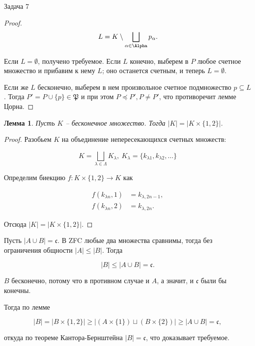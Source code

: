 \documentclass{article}
\newtheorem{lemma}{Лемма}
\newcommand{\abs}[1]{\left\lvert#1\right\rvert}
\newcommand{\continuum}{\mathfrak{c}}
\renewcommand{\setminus}{\mathbin{\backslash}}
\begin{document}
\begin{section}{Задача 7}
\begin{proof}
			\begin{equation*}
				L = K \setminus \bigsqcup_{\alpha \in \Alpha} p_\alpha.
			\end{equation*}

			Если $L = \emptyset$, получено требуемое. Если $L$ конечно, выберем в $P$ любое счетное множество и прибавим к нему $L$; оно останется счетным, и теперь $L = \emptyset$.

			Если же $L$ бесконечно, выберем в нем произвольное счетное подмножество $p \subseteq L$. Тогда $P' = P \cup \{p\} \in \mathfrak{P}$ и при этом $P \preceq P', P \ne P'$, что противоречит лемме Цорна.
		\end{proof}

		\begin{lemma}
			Пусть $K$ -- бесконечное множество. Тогда $\abs{K} = \abs{K \times \{1, 2\}}$.
		\end{lemma}

		\begin{proof}
			Разобьем $K$ на объединение непересекающихся счетных множеств:

			\begin{equation*}
				K = \bigsqcup_{\lambda \in \Lambda} K_\lambda, \ K_\lambda = \{ k_{\lambda1}, k_{\lambda2}, \dots \}
			\end{equation*}

			Определим биекцию $f: K \times \{1, 2\} \to K$ как

			\begin{align*}
				f(k_{\lambda n}, 1) &= k_{\lambda, 2n-1}, \\
				f(k_{\lambda n}, 2) &= k_{\lambda, 2n}.
			\end{align*}

			Отсюда $\abs{K} = \abs{K \times \{1, 2\}}$.
		\end{proof}

		Пусть $\abs{A \cup B} = \continuum$. В ZFC любые два множества сравнимы, тогда без ограничения общности $\abs{A} \le \abs{B}$. Тогда

		\begin{equation*}
			\abs{B} \le \abs{A \cup B} = \continuum.
		\end{equation*}

		$B$ бесконечно, потому что в противном случае и $A$, а значит, и $\continuum$ были бы конечны.

		Тогда по лемме

		\begin{equation*}
			\abs{B} = \abs{B \times \{1, 2\}} \ge \abs{(A \times \{1\}) \sqcup (B \times \{2\})} \ge \abs{A \cup B} = \continuum,
		\end{equation*}

		откуда по теореме Кантора-Бернштейна $\abs{B} = \continuum$, что доказывает требуемое.
	\end{section}
\end{document}
